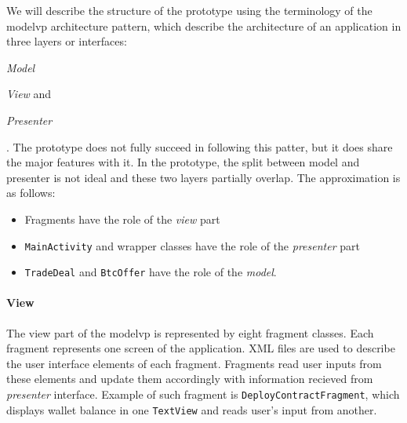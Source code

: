 We will describe the structure of the prototype using the terminology of the \acrfull{modelvp} architecture pattern, which describe the architecture of an application in three layers or interfaces:
\begin{enumerate*}[label=(\roman*)]
    \item \textit{Model}
    \item \textit{View} and
    \item \textit{Presenter}
\end{enumerate*}.
The prototype does not fully succeed in following this patter, but it does share the major features with it. In the prototype, the split between model and presenter is not ideal and these two layers partially overlap. The approximation is as follows:
\begin{itemize}[noitemsep]
    \item Fragments have the role of the \textit{view} part
    \item \texttt{MainActivity} and wrapper classes have the role of the \textit{presenter} part
    \item \texttt{TradeDeal} and \texttt{BtcOffer} have the role of the \textit{model}.
\end{itemize}

\paragraph{View} The view part of the \acrshort{modelvp} is represented by eight fragment classes. Each fragment represents one screen of the application. XML files are used to describe the user interface elements of each fragment. Fragments read user inputs from these elements and update them accordingly with information recieved from \textit{presenter} interface. Example of such fragment is \texttt{DeployContractFragment}, which displays wallet balance in one \texttt{TextView} and reads user's input from another.

